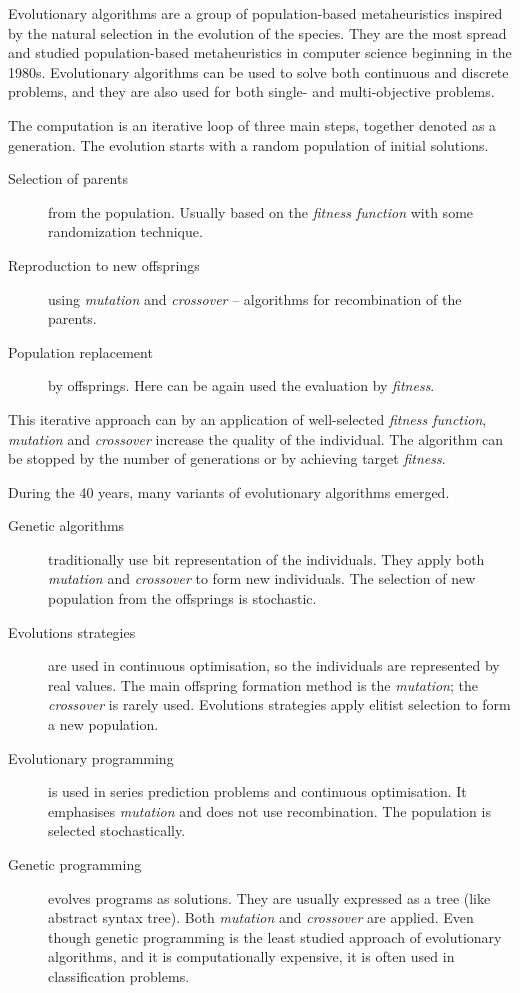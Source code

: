 \documentclass[
    digital,    %
    oneside,    %
    color,
    11pt,
    nocover,
    notable,
    nolof,
    nolot,
]{fithesis3}
\begin{document}
Evolutionary algorithms are a group of population-based metaheuristics inspired by the natural selection in the evolution of the species. They are the most spread and studied population-based metaheuristics in computer science beginning in the 1980s. Evolutionary algorithms can be used to solve both continuous and discrete problems, and they are also used for both single- and multi-objective problems.

The computation is an iterative loop of three main steps, together denoted as a generation. The evolution starts with a random population of initial solutions.

\begin{description}
    \item[Selection of parents] from the population. Usually based on the \textit{fitness function} with some randomization technique.
    \item[Reproduction to new offsprings] using \textit{mutation} and \textit{crossover} -- algorithms for recombination of the parents.
    \item[Population replacement] by offsprings. Here can be again used the evaluation by \textit{fitness}. 
\end{description}

This iterative approach can by an application of well-selected \textit{fitness function}, \textit{mutation} and \textit{crossover} increase the quality of the individual. The algorithm can be stopped by the number of generations or by achieving target \textit{fitness}.

During the 40 years, many variants of evolutionary algorithms emerged.

\begin{description}
    \item[Genetic algorithms] traditionally use bit representation of the individuals. They apply both \textit{mutation} and \textit{crossover} to form new individuals. The selection of new population from the offsprings is stochastic.
    \item[Evolutions strategies] are used in continuous optimisation, so the individuals are represented by real values. The main offspring formation method is the \textit{mutation}; the \textit{crossover} is rarely used. Evolutions strategies apply elitist selection to form a new population.
    \item[Evolutionary programming] is used in series prediction problems and continuous optimisation. It emphasises \textit{mutation} and does not use recombination. The population is selected stochastically.
    \item[Genetic programming] evolves programs as solutions. They are usually expressed as a tree (like abstract syntax tree). Both \textit{mutation} and \textit{crossover} are applied. Even though genetic programming is the least studied approach of evolutionary algorithms, and it is computationally expensive, it is often used in classification problems.
\end{description}
\end{document}
